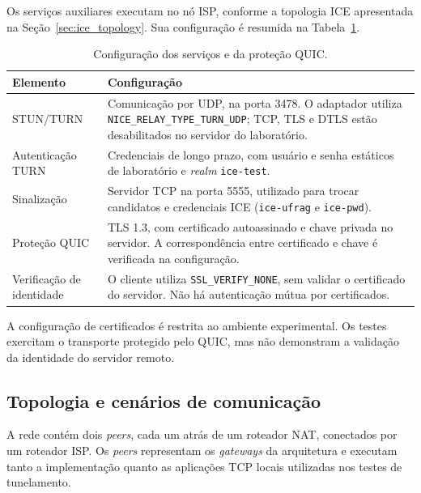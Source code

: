 Os serviços auxiliares executam no nó ISP, conforme a topologia ICE apresentada na Seção~\ref{sec:ice_topology}. Sua configuração é resumida na Tabela~\ref{tab:experimental_services}.

\begin{table}[htbp]
    \centering
    \begin{tabular}{@{}p{}p{}@{}}
        \toprule
        \textbf{Elemento} & \textbf{Configuração} \\
        \midrule
        STUN/TURN &
        Comunicação por UDP, na porta 3478.
        O adaptador utiliza
        \texttt{NICE\_RELAY\_TYPE\_TURN\_UDP};
        TCP, TLS e DTLS estão desabilitados no servidor
        do laboratório. \\
        Autenticação TURN &
        Credenciais de longo prazo, com usuário e senha
        estáticos de laboratório e \textit{realm}
        \texttt{ice-test}. \\
        Sinalização &
        Servidor TCP na porta 5555, utilizado para trocar
        candidatos e credenciais ICE
        (\texttt{ice-ufrag} e \texttt{ice-pwd}). \\
        Proteção QUIC &
        TLS 1.3, com certificado autoassinado e chave
        privada no servidor. A correspondência entre
        certificado e chave é verificada na configuração. \\
        Verificação de identidade &
        O cliente utiliza \texttt{SSL\_VERIFY\_NONE},
        sem validar o certificado do servidor.
        Não há autenticação mútua por certificados. \\
        \bottomrule
    \end{tabular}
    \caption{Configuração dos serviços e da proteção QUIC.}
    \label{tab:experimental_services}
\end{table}

A configuração de certificados é restrita ao ambiente experimental. Os testes exercitam o transporte protegido pelo QUIC, mas não demonstram a validação da identidade do servidor remoto.

\subsection{Topologia e cenários de comunicação}
\label{sec:experimental_scenarios}

A rede contém dois \textit{peers}, cada um atrás de um roteador NAT, conectados por um roteador ISP. Os \textit{peers} representam os \textit{gateways} da arquitetura e executam tanto a implementação quanto as aplicações TCP locais utilizadas nos testes de tunelamento.

